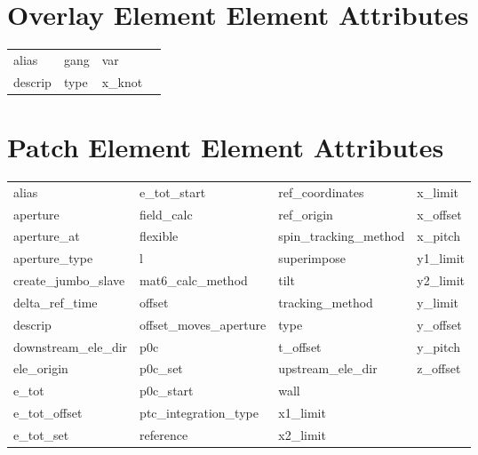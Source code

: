  \vfill
 
 \section{Overlay Element Element Attributes}
 \label{s:list.overlay}
 
 \begin{tabular}{llll} \toprule
alias                       & gang                        & var                         &                             \\
descrip                     & type                        & x_knot                      &                             \\
 \bottomrule
 \end{tabular}
 \vfill
 
 \section{Patch Element Element Attributes}
 \label{s:list.patch}
 
 \begin{tabular}{llll} \toprule
alias                       & e_tot_start                 & ref_coordinates             & x_limit                     \\
aperture                    & field_calc                  & ref_origin                  & x_offset                    \\
aperture_at                 & flexible                    & spin_tracking_method        & x_pitch                     \\
aperture_type               & l                           & superimpose                 & y1_limit                    \\
create_jumbo_slave          & mat6_calc_method            & tilt                        & y2_limit                    \\
delta_ref_time              & offset                      & tracking_method             & y_limit                     \\
descrip                     & offset_moves_aperture       & type                        & y_offset                    \\
downstream_ele_dir          & p0c                         & t_offset                    & y_pitch                     \\
ele_origin                  & p0c_set                     & upstream_ele_dir            & z_offset                    \\
e_tot                       & p0c_start                   & wall                        &                             \\
e_tot_offset                & ptc_integration_type        & x1_limit                    &                             \\
e_tot_set                   & reference                   & x2_limit                    &                             \\
 \bottomrule
 \end{tabular}
 \vfill
 
